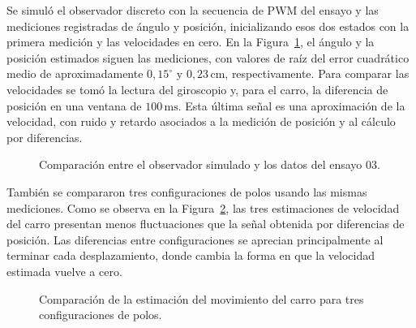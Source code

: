 \documentclass[a4paper, twoside, 10pt, spanish]{article}
\numberwithin{table}{section}
\begin{document}
Se simuló el observador discreto con la secuencia de PWM del ensayo y las mediciones registradas de ángulo y posición, inicializando esos dos estados con la primera medición y las velocidades en cero. En la Figura~\ref{fig:observador-completo-ensayo03}, el ángulo y la posición estimados siguen las mediciones, con valores de raíz del error cuadrático medio de aproximadamente $0{,}15^\circ$ y $0{,}23\,\mathrm{cm}$, respectivamente. Para comparar las velocidades se tomó la lectura del giroscopio y, para el carro, la diferencia de posición en una ventana de $100\,\mathrm{ms}$. Esta última señal es una aproximación de la velocidad, con ruido y retardo asociados a la medición de posición y al cálculo por diferencias.

\begin{figure}[H]
    \centering
    \caption{Comparación entre el observador simulado y los datos del ensayo 03.}
    \label{fig:observador-completo-ensayo03}
\end{figure}

También se compararon tres configuraciones de polos usando las mismas mediciones. Como se observa en la Figura~\ref{fig:observador-completo-comparacion-polos}, las tres estimaciones de velocidad del carro presentan menos fluctuaciones que la señal obtenida por diferencias de posición. Las diferencias entre configuraciones se aprecian principalmente al terminar cada desplazamiento, donde cambia la forma en que la velocidad estimada vuelve a cero.

\begin{figure}[H]
    \centering
    \caption{Comparación de la estimación del movimiento del carro para tres configuraciones de polos.}
    \label{fig:observador-completo-comparacion-polos}
\end{figure}
\end{document}
